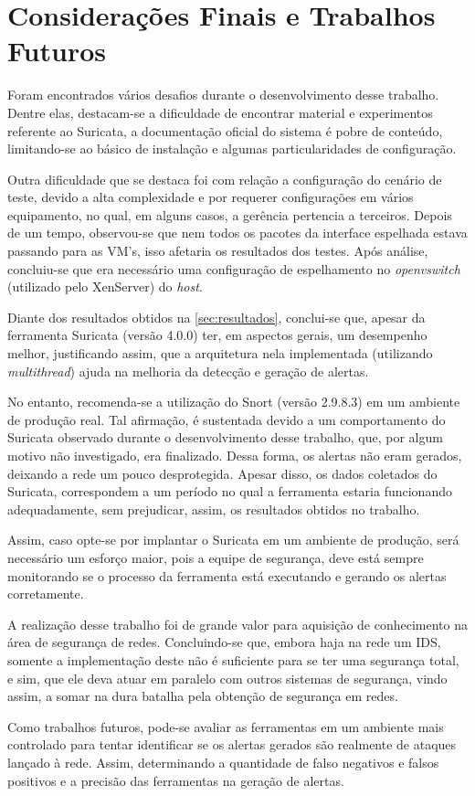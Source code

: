 \chapter{Considerações Finais e Trabalhos Futuros} \label{ch:considerações}

Foram encontrados vários desafios durante o desenvolvimento desse trabalho. Dentre elas, destacam-se a dificuldade de encontrar material e experimentos referente ao Suricata, a documentação oficial do sistema é pobre de conteúdo, limitando-se ao básico de instalação e algumas particularidades de configuração. 

Outra dificuldade que se destaca foi com relação a configuração do cenário de teste, devido a alta complexidade e por requerer configurações em vários equipamento, no qual, em alguns casos, a gerência pertencia a terceiros. Depois de um tempo, observou-se que nem todos os pacotes da interface espelhada estava passando para as VM's, isso afetaria os resultados dos testes. Após análise, concluiu-se que era necessário uma configuração de espelhamento no \textit{openvswitch} (utilizado pelo XenServer) do \textit{host}.

Diante dos resultados obtidos na \autoref{sec:resultados}, conclui-se que, apesar da ferramenta Suricata (versão 4.0.0) ter, em aspectos gerais, um desempenho melhor, justificando assim, que a arquitetura nela implementada (utilizando \textit{multithread}) ajuda na melhoria da detecção e geração de alertas. 

No entanto, recomenda-se a utilização do Snort (versão 2.9.8.3) em um ambiente de produção real. Tal afirmação, é sustentada devido a um comportamento do Suricata observado durante o desenvolvimento desse trabalho, que, por algum motivo não investigado, era finalizado. Dessa forma, os alertas não eram gerados, deixando a rede um pouco desprotegida. Apesar disso, os dados coletados do Suricata, correspondem a um período no qual a ferramenta estaria funcionando adequadamente, sem prejudicar, assim, os resultados obtidos no trabalho. 

Assim, caso opte-se por implantar o Suricata em um ambiente de produção, será necessário um esforço maior, pois a equipe de segurança, deve está sempre monitorando se o processo da ferramenta está executando e gerando os alertas corretamente.

A realização desse trabalho foi de grande valor para aquisição de conhecimento na área de segurança de redes. Concluindo-se que, embora haja na rede um IDS, somente a implementação deste não é suficiente para se ter uma segurança total, e sim, que ele deva atuar em paralelo com outros sistemas de segurança, vindo assim, a somar na dura batalha pela obtenção de segurança em redes. 

Como trabalhos futuros, pode-se avaliar as ferramentas em um ambiente mais controlado para tentar identificar se os alertas gerados são realmente de ataques lançado à rede. Assim, determinando a quantidade de falso negativos e falsos positivos e a precisão das ferramentas na geração de alertas.
